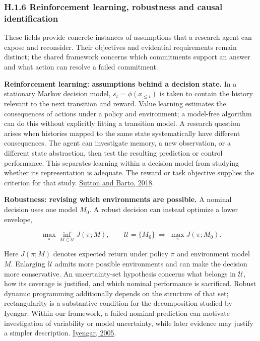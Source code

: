 \documentclass[11pt,a4paper]{article}
\begin{document}
\subsubsection*{H.1.6 Reinforcement learning, robustness and causal identification}

These fields provide concrete instances of assumptions that a research agent can expose and reconsider. Their objectives and evidential requirements remain distinct; the shared framework concerns which commitments support an answer and what action can resolve a failed commitment.


\textbf{Reinforcement learning: assumptions behind a decision state.} In a stationary Markov decision model, \(s_t=\phi(x_{\leq t})\) is taken to contain the history relevant to the next transition and reward. Value learning estimates the consequences of actions under a policy and environment; a model-free algorithm can do this without explicitly fitting a transition model. A research question arises when histories mapped to the same state systematically have different consequences. The agent can investigate memory, a new observation, or a different state abstraction, then test the resulting prediction or control performance. This separates learning within a decision model from studying whether its representation is adequate. The reward or task objective supplies the criterion for that study. \href{https://mitpress.mit.edu/9780262039246/reinforcement-learning/}{Sutton and Barto, 2018}.


\textbf{Robustness: revising which environments are possible.} A nominal decision uses one model \(M_0\). A robust decision can instead optimize a lower envelope,


\[
\max_\pi\inf_{M\in\mathcal U}J(\pi;M),
\qquad
\mathcal U=\{M_0\}\ \Longrightarrow\ \max_\pi J(\pi;M_0).
\]


Here \(J(\pi;M)\) denotes expected return under policy \(\pi\) and environment model \(M\). Enlarging \(\mathcal U\) admits more possible environments and can make the decision more conservative. An uncertainty-set hypothesis concerns what belongs in \(\mathcal U\), how its coverage is justified, and which nominal performance is sacrificed. Robust dynamic programming additionally depends on the structure of that set; rectangularity is a substantive condition for the decomposition studied by Iyengar. Within our framework, a failed nominal prediction can motivate investigation of variability or model uncertainty, while later evidence may justify a simpler description. \href{https://doi.org/10.1287/moor.1040.0129}{Iyengar, 2005}.
\end{document}
